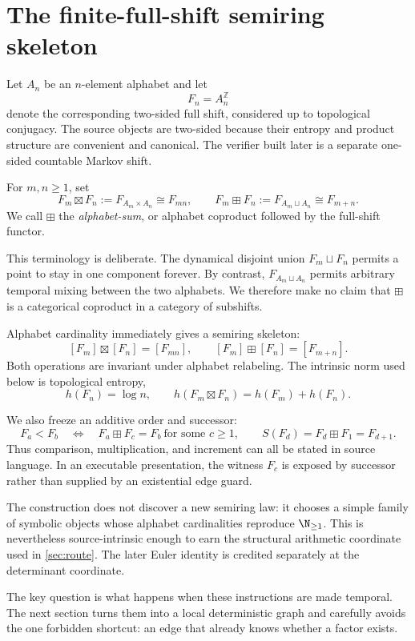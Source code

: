 \section{The finite-full-shift semiring skeleton}
\label{sec:semiring}

Let $A_n$ be an $n$-element alphabet and let
\[
F_n=A_n^{\mathbb Z}
\]
denote the corresponding two-sided full shift, considered up to topological
conjugacy.  The source objects are two-sided because their entropy and
product structure are convenient and canonical.  The verifier built later
is a separate one-sided countable Markov shift.

\begin{definition}
For $m,n\ge1$, set
\[
F_m\boxtimes F_n:=F_{A_m\times A_n}\cong F_{mn},
\qquad
F_m\boxplus F_n:=F_{A_m\sqcup A_n}\cong F_{m+n}.
\]
We call $\boxplus$ the \emph{alphabet-sum}, or alphabet coproduct followed by
the full-shift functor.
\end{definition}

This terminology is deliberate.  The dynamical disjoint union
$F_m\sqcup F_n$ permits a point to stay in one component forever.  By
contrast, $F_{A_m\sqcup A_n}$ permits arbitrary temporal mixing between the
two alphabets.  We therefore make no claim that $\boxplus$ is a categorical
coproduct in a category of subshifts.

Alphabet cardinality immediately gives a semiring skeleton:
\[
[F_m]\boxtimes[F_n]=[F_{mn}],\qquad
[F_m]\boxplus[F_n]=[F_{m+n}].
\]
Both operations are invariant under alphabet relabeling.  The intrinsic norm
used below is topological entropy,
\[
h(F_n)=\log n,
\qquad
h(F_m\boxtimes F_n)=h(F_m)+h(F_n).
\]

We also freeze an additive order and successor:
\[
F_a<F_b
\quad\Longleftrightarrow\quad
F_a\boxplus F_c=F_b\ \text{for some }c\ge1,
\qquad
S(F_d)=F_d\boxplus F_1=F_{d+1}.
\]
Thus comparison, multiplication, and increment can all be stated in source
language.  In an executable presentation, the witness $F_c$ is exposed by
successor rather than supplied by an existential edge guard.

\begin{remark}
The construction does not discover a new semiring law: it chooses a simple
family of symbolic objects whose alphabet cardinalities reproduce
$\N_{\ge1}$.  This is nevertheless source-intrinsic enough to earn the
structural arithmetic coordinate used in \cref{sec:route}.  The later Euler
identity is credited separately at the determinant coordinate.
\end{remark}

The key question is what happens when these instructions are made temporal.
The next section turns them into a local deterministic graph and carefully
avoids the one forbidden shortcut: an edge that already knows whether a
factor exists.
